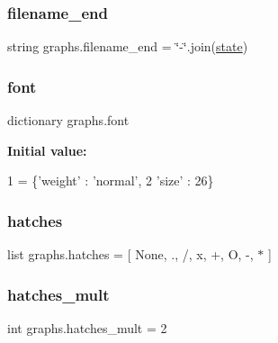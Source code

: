 \subsubsection{\texorpdfstring{filename\+\_\+end}{filename\_end}}
{\footnotesize\ttfamily string graphs.\+filename\+\_\+end = \char`\"{}-\/\char`\"{}.join(\hyperlink{namespacegraphs_a7e28b4b5f2a57b0c7edebb674233cf1e}{state})}

\mbox{\label{namespacegraphs_a156f07dcbb979d6e2f598038daab686e}} 
\subsubsection{\texorpdfstring{font}{font}}
{\footnotesize\ttfamily dictionary graphs.\+font}

{\bfseries Initial value\+:}
\begin{DoxyCode}
1 =  \{\textcolor{stringliteral}{'weight'} : \textcolor{stringliteral}{'normal'},
2             \textcolor{stringliteral}{'size'}   : 26\}
\end{DoxyCode}
\mbox{\label{namespacegraphs_a7834f87f73120010330fe10b311d2274}} 
\subsubsection{\texorpdfstring{hatches}{hatches}}
{\footnotesize\ttfamily list graphs.\+hatches = \mbox{[} None, \textquotesingle{}.\textquotesingle{}, \textquotesingle{}/\textquotesingle{}, \textquotesingle{}x\textquotesingle{}, \textquotesingle{}+\textquotesingle{}, \textquotesingle{}O\textquotesingle{}, \textquotesingle{}-\/\textquotesingle{}, \textquotesingle{}$\ast$\textquotesingle{} \mbox{]}}

\mbox{\label{namespacegraphs_aff4f36c8185bf496f3f8674653eb94f7}} 
\subsubsection{\texorpdfstring{hatches\+\_\+mult}{hatches\_mult}}
{\footnotesize\ttfamily int graphs.\+hatches\+\_\+mult = 2}

\mbox{\label{namespacegraphs_a56c4073988138ac93b88d0073f9af851}} 
